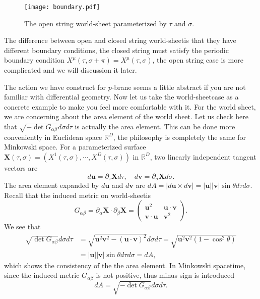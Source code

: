 \documentclass[graybox,envcountchap,sectrefs]{svmono}
\begin{document}
\begin{figure}
\centering
\texttt{[image: boundary.pdf]}
\caption{The open string world-sheet parameterized by $\tau$ and $\sigma$.}	
\end{figure}


The difference between open and closed string world-sheetis that they have different boundary conditions, the closed string must satisfy the periodic boundary condition $X^{\mu}(\tau,\sigma+\pi)=X^{\mu}(\tau,\sigma)$, the open string case is more complicated and we will discussion it later.

The action we have construct for $p$-brane seems a little abstract if you are not familiar with differential geometry. Now let us take the world-sheetcase as a concrete example to make you feel more comfortable with it. For the world sheet, we are concerning about the area element of the world sheet. Let us check here that 
$\sqrt{-\det G_{\alpha\beta}}d\sigma d\tau$ is actually the area element. This can be done more conveniently in Euclidean space $\mathbb{R}^D$, the philosophy is completely the same for Minkowski space. For a parameterized surface $\mathbf{X}(\tau,\sigma)=(X^1(\tau,\sigma),\cdots, X^D(\tau,\sigma))$ in  $\mathbb{R}^D$, two linearly independent tangent vectors are 
\begin{equation}
d\mathbf{u}=\partial_{\tau}\mathbf{X}d\tau,\quad d\mathbf{v}=\partial_{\sigma}\mathbf{X}d\sigma.
\end{equation}
The area element expanded by $d\mathbf{u}$ and $d\mathbf{v}$ are $dA=|d\mathbf{u}\times d\mathbf{v}|=|\mathbf{u}||\mathbf{v}|\sin \theta d\tau d\sigma$.
Recall that the induced metric on world-sheetis 
\begin{equation}
G_{\alpha\beta}=\partial_{\alpha}\mathbf{X}\cdot \partial_{\beta}\mathbf{X}=\left(\begin{array}{cc}\mathbf{u}^2 & \mathbf{u}\cdot\mathbf{v} \\ \mathbf{v}\cdot\mathbf{u} & \mathbf{v}^2\end{array}\right).
\end{equation}
We see that 
\begin{align}
\sqrt{\det G_{\alpha\beta}}d\sigma d\tau&= \sqrt{\mathbf{u}^2\mathbf{v}^2-(\mathbf{u}\cdot \mathbf{v})^2}d\sigma d\tau=\sqrt{\mathbf{u}^2\mathbf{v}^2(1-\cos^2\theta)}\nonumber\\
&=|\mathbf{u}||\mathbf{v}|\sin \theta d\tau d\sigma=dA,
\end{align}
which shows the consistency of the the area element. In Minkowski spacetime, since the induced metric  $G_{\alpha\beta}$ is not positive, thus minus sign is introduced
\begin{equation}
dA=\sqrt{-\det G_{\alpha\beta}}d\sigma d\tau.
\end{equation}
\end{document}

